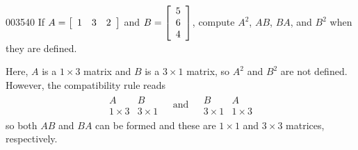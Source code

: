 \begin{example}{}{003540}
If $A = \left[ \begin{array}{ccc}
1 & 3 & 2\end{array}\right]$ and $B = \left[ \begin{array}{r}
5 \\
6 \\
4
\end{array} \right]$, compute $A^{2}$, $AB$, $BA$, and $B^{2}$ when they are defined.\footnotemark

\begin{solution}
  Here, $A$ is a $1 \times 3$ matrix and $B$ is a $3 \times 1$ matrix, so $A^{2}$ and $B^{2}$ are not defined. However, the compatibility rule reads
\begin{equation*}
\begin{array}{ccc}
\begin{array}{cc}
A & B\\
1 \times 3 & 3 \times 1
\end{array}
& \mbox{ and } &
\begin{array}{cc}
B & A \\
3 \times 1 & 1 \times 3
\end{array}
\end{array}
\end{equation*}
so both $AB$ and $BA$ can be formed and these are $1 \times 1$ and $3 \times 3$ matrices, respectively.



\end{solution}
\end{example}
